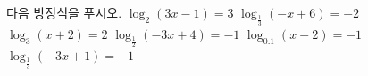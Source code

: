 다음 방정식을 푸시오.
 $\log_2 (3x-1)=3$
 $\log_{\frac{1}{3}} (-x+6)=-2$
 $\log_3 (x+2)=2$
 $\log_{\frac{1}{2}} (-3x+4)=-1$
 $\log_{0.1} (x-2)=-1$
 $\log_{\frac{1}{3}} (-3x+1)=-1$
